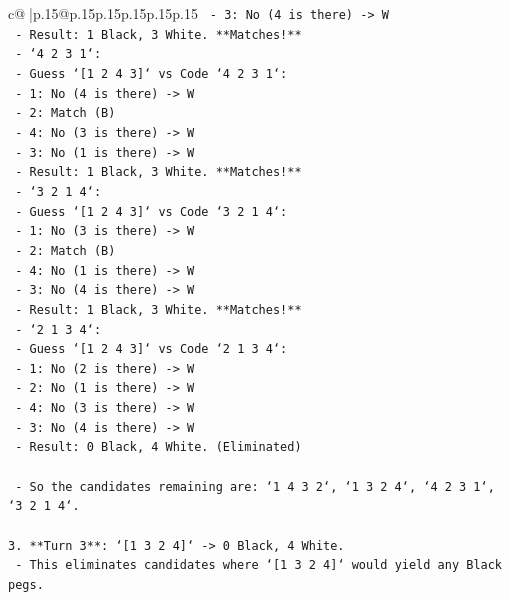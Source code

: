 \documentclass{article}
\begin{document}
{\begin{supertabular}{c@{$\;$}|p{.15\linewidth}@{}p{.15\linewidth}p{.15\linewidth}p{.15\linewidth}p{.15\linewidth}p{.15\linewidth}}
{{{\texttt{            {-} 3: No (4 is there) {-}> W} \\
\texttt{            {-} Result: 1 Black, 3 White. **Matches!**} \\
\texttt{        {-} `4 2 3 1`:} \\
\texttt{          {-} Guess `{[}1 2 4 3{]}` vs Code `4 2 3 1`:} \\
\texttt{            {-} 1: No (4 is there) {-}> W} \\
\texttt{            {-} 2: Match (B)} \\
\texttt{            {-} 4: No (3 is there) {-}> W} \\
\texttt{            {-} 3: No (1 is there) {-}> W} \\
\texttt{            {-} Result: 1 Black, 3 White. **Matches!**} \\
\texttt{        {-} `3 2 1 4`:} \\
\texttt{          {-} Guess `{[}1 2 4 3{]}` vs Code `3 2 1 4`:} \\
\texttt{            {-} 1: No (3 is there) {-}> W} \\
\texttt{            {-} 2: Match (B)} \\
\texttt{            {-} 4: No (1 is there) {-}> W} \\
\texttt{            {-} 3: No (4 is there) {-}> W} \\
\texttt{            {-} Result: 1 Black, 3 White. **Matches!**} \\
\texttt{        {-} `2 1 3 4`:} \\
\texttt{          {-} Guess `{[}1 2 4 3{]}` vs Code `2 1 3 4`:} \\
\texttt{            {-} 1: No (2 is there) {-}> W} \\
\texttt{            {-} 2: No (1 is there) {-}> W} \\
\texttt{            {-} 4: No (3 is there) {-}> W} \\
\texttt{            {-} 3: No (4 is there) {-}> W} \\
\texttt{            {-} Result: 0 Black, 4 White. (Eliminated)} \\
\\ 
\texttt{    {-} So the candidates remaining are: `1 4 3 2`, `1 3 2 4`, `4 2 3 1`, `3 2 1 4`.} \\
\\ 
\texttt{3.  **Turn 3**: `{[}1 3 2 4{]}` {-}> 0 Black, 4 White.} \\
\texttt{    {-} This eliminates candidates where `{[}1 3 2 4{]}` would yield any Black pegs.} \\
}}}
\end{supertabular}}
\end{document}
